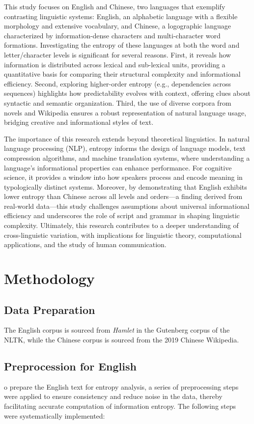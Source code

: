 \documentclass[12pt]{article}
\begin{document}
This study focuses on English and Chinese, two languages that exemplify contrasting linguistic systems: English, an alphabetic language with a flexible morphology and extensive vocabulary, and Chinese, a logographic language characterized by information-dense characters and multi-character word formations. Investigating the entropy of these languages at both the word and letter/character levels is significant for several reasons. First, it reveals how information is distributed across lexical and sub-lexical units, providing a quantitative basis for comparing their structural complexity and informational efficiency. Second, exploring higher-order entropy (e.g., dependencies across sequences) highlights how predictability evolves with context, offering clues about syntactic and semantic organization. Third, the use of diverse corpora from novels and Wikipedia ensures a robust representation of natural language usage, bridging creative and informational styles of text.

The importance of this research extends beyond theoretical linguistics. In natural language processing (NLP), entropy informs the design of language models, text compression algorithms, and machine translation systems, where understanding a language’s informational properties can enhance performance. For cognitive science, it provides a window into how speakers process and encode meaning in typologically distinct systems. Moreover, by demonstrating that English exhibits lower entropy than Chinese across all levels and orders—a finding derived from real-world data—this study challenges assumptions about universal informational efficiency and underscores the role of script and grammar in shaping linguistic complexity. Ultimately, this research contributes to a deeper understanding of cross-linguistic variation, with implications for linguistic theory, computational applications, and the study of human communication.
\section*{\centering Methodology}

\subsection*{\centering Data Preparation}
The English corpus is sourced from \textit{Hamlet} in the Gutenberg corpus of the NLTK\cite{bird2006}, while the Chinese corpus is sourced from the 2019 Chinese Wikipedia.
\subsection*{\centering Preprocession for English}
o prepare the English text for entropy analysis, a series of preprocessing steps were applied to ensure consistency and reduce noise in the data, thereby facilitating accurate computation of information entropy. The following steps were systematically implemented:
\end{document}
